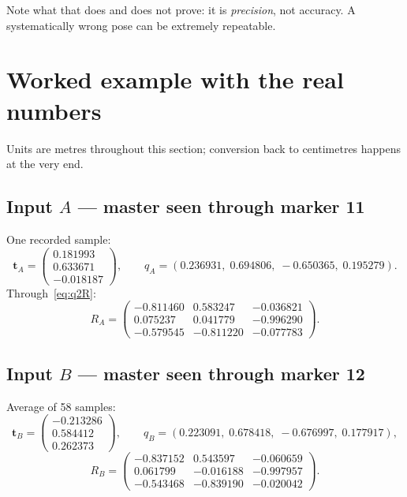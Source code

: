 \documentclass[11pt,a4paper]{article}
\newcommand{\vt}[1]{\mathbf{#1}}
\begin{document}
Note what that does and does not prove: it is \emph{precision}, not accuracy. A
systematically wrong pose can be extremely repeatable.

\section{Worked example with the real numbers}

Units are metres throughout this section; conversion back to centimetres happens at the
very end.

\subsection{Input $A$ --- master seen through marker 11}

One recorded sample:
\begin{equation*}
  \vt{t}_A = \begin{pmatrix} 0.181993 \\ 0.633671 \\ -0.018187 \end{pmatrix},
  \qquad
  q_A = (0.236931,\; 0.694806,\; -0.650365,\; 0.195279).
\end{equation*}
Through~\eqref{eq:q2R}:
\begin{equation*}
  R_A =
  \begin{pmatrix}
    -0.811460 &  0.583247 & -0.036821 \\
     0.075237 &  0.041779 & -0.996290 \\
    -0.579545 & -0.811220 & -0.077783
  \end{pmatrix}.
\end{equation*}

\subsection{Input $B$ --- master seen through marker 12}

Average of 58 samples:
\begin{equation*}
  \vt{t}_B = \begin{pmatrix} -0.213286 \\ 0.584412 \\ 0.262373 \end{pmatrix},
  \qquad
  q_B = (0.223091,\; 0.678418,\; -0.676997,\; 0.177917),
\end{equation*}
\begin{equation*}
  R_B =
  \begin{pmatrix}
    -0.837152 &  0.543597 & -0.060659 \\
     0.061799 & -0.016188 & -0.997957 \\
    -0.543468 & -0.839190 & -0.020042
  \end{pmatrix}.
\end{equation*}
\end{document}
